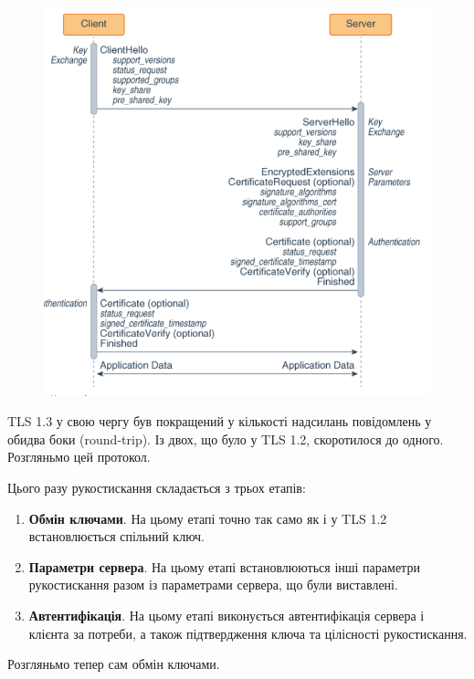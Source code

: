 \begin{figure}[ht]
        \centering
        \includegraphics[scale=0.35]{../IMAGES/tls_1_3.png}
        \label{tls_1_3}
\end{figure}

TLS 1.3 у свою чергу був покращений у кількості надсилань повідомлень у обидва боки (round-trip). Із двох, що було у TLS 1.2, скоротилося до одного. Розгляньмо цей протокол.

Цього разу рукостискання складається з трьох етапів:
\begin{enumerate}
    \item \textbf{Обмін ключами}. На цьому етапі точно так само як і у TLS 1.2 встановлюється спільний ключ.
    \item \textbf{Параметри сервера}. На цьому етапі встановлюються інші параметри рукостискання разом із параметрами сервера, що були виставлені.
    \item \textbf{Автентифікація}. На цьому етапі виконується автентифікація сервера і клієнта за потреби, а також підтвердження ключа та цілісності рукостискання.
\end{enumerate}


Розгляньмо тепер сам обмін ключами.

